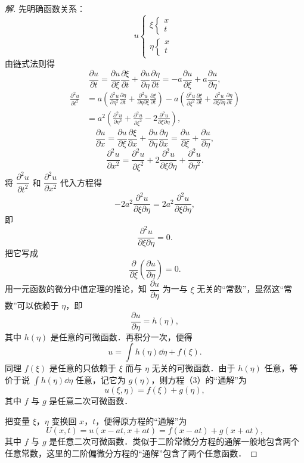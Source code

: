 \begin{proof}[解]
先明确函数关系：
\[
u\left\{\begin{array}{l}\xi\left\{\begin{array}{l}x\\ t\end{array}\right.\\[4pt] \eta\left\{\begin{array}{l}x\\ t\end{array}\right.\end{array}\right.
\]
由链式法则得
\[
\frac{\partial u}{\partial t}=\frac{\partial u}{\partial\xi}\frac{\partial\xi}{\partial t}+\frac{\partial u}{\partial\eta}\frac{\partial\eta}{\partial t}=-a\frac{\partial u}{\partial\xi}+a\frac{\partial u}{\partial\eta},
\]
\[
\begin{aligned}
\frac{\partial^{2}u}{\partial t^{2}}&=a\left(\frac{\partial^{2}u}{\partial\eta^{2}}\frac{\partial\eta}{\partial t}+\frac{\partial^{2}u}{\partial\eta\partial\xi}\frac{\partial\xi}{\partial t}\right)-a\left(\frac{\partial^{2}u}{\partial\xi^{2}}\frac{\partial\xi}{\partial t}+\frac{\partial^{2}u}{\partial\xi\partial\eta}\frac{\partial\eta}{\partial t}\right)\\
&=a^{2}\left(\frac{\partial^{2}u}{\partial\eta^{2}}+\frac{\partial^{2}u}{\partial\xi^{2}}-2\frac{\partial^{2}u}{\partial\xi\partial\eta}\right),
\end{aligned}
\]
\[
\frac{\partial u}{\partial x}=\frac{\partial u}{\partial\xi}\frac{\partial\xi}{\partial x}+\frac{\partial u}{\partial\eta}\frac{\partial\eta}{\partial x}=\frac{\partial u}{\partial\xi}+\frac{\partial u}{\partial\eta},
\]
\[
\frac{\partial^{2}u}{\partial x^{2}}=\frac{\partial^{2}u}{\partial\xi^{2}}+2\frac{\partial^{2}u}{\partial\xi\partial\eta}+\frac{\partial^{2}u}{\partial\eta^{2}}.
\]
将 $\dfrac{\partial^{2}u}{\partial t^{2}}$ 和 $\dfrac{\partial^{2}u}{\partial x^{2}}$ 代入方程得
\[
-2a^{2}\frac{\partial^{2}u}{\partial\xi\partial\eta}=2a^{2}\frac{\partial^{2}u}{\partial\xi\partial\eta},
\]
即
\begin{equation}
\frac{\partial^{2}u}{\partial\xi\partial\eta}=0.
\tag{3}
\end{equation}
把它写成
\[
\frac{\partial}{\partial\xi}\left(\frac{\partial u}{\partial\eta}\right)=0.
\]
用一元函数的微分中值定理的推论，知 $\dfrac{\partial u}{\partial\eta}$ 为一与 $\xi$ 无关的``常数''，显然这``常数''可以依赖于 $\eta$，即
\[
\frac{\partial u}{\partial\eta}=h(\eta),
\]
其中 $h(\eta)$ 是任意的可微函数．再积分一次，便得
\[
u=\int h(\eta)\dd\eta+f(\xi).
\]
同理 $f(\xi)$ 是任意的只依赖于 $\xi$ 而与 $\eta$ 无关的可微函数．由于 $h(\eta)$ 任意，等价于说 $\displaystyle\int h(\eta)\dd\eta$ 任意，记它为 $g(\eta)$，则方程（3）的``通解''为
\[
u(\xi,\eta)=f(\xi)+g(\eta),
\]
其中 $f$ 与 $g$ 是任意二次可微函数．

把变量 $\xi$，$\eta$ 变换回 $x$，$t$，便得原方程的``通解''为
\[
U(x,t)=u(x-at,x+at)=f(x-at)+g(x+at),
\]
其中 $f$ 与 $g$ 是任意二次可微函数．类似于二阶常微分方程的通解一般地包含两个任意常数，这里的二阶偏微分方程的``通解''包含了两个任意函数．
\end{proof}

